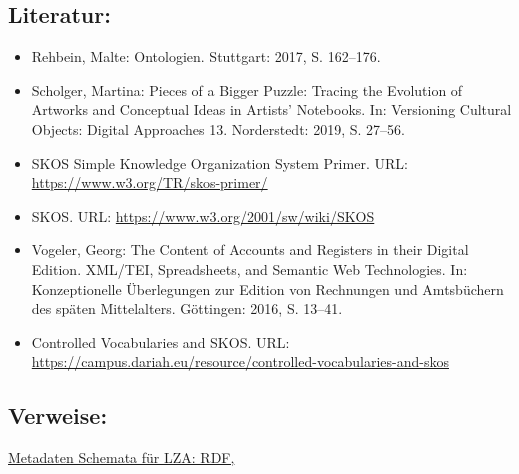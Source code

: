 \documentclass{article}
\begin{document}
        \subsection*{Literatur:}\begin{itemize}\item Rehbein, Malte: Ontologien. Stuttgart: 2017, S. 162–176.\item Scholger, Martina: Pieces of a Bigger Puzzle: Tracing the Evolution of
                              Artworks and Conceptual Ideas in Artists' Notebooks. In: Versioning Cultural Objects: Digital Approaches 13. Norderstedt: 2019, S. 27–56.\item SKOS Simple Knowledge Organization System Primer. URL: \url{https://www.w3.org/TR/skos-primer/}\item SKOS. URL: \url{https://www.w3.org/2001/sw/wiki/SKOS}\item Vogeler, Georg: The Content of Accounts and Registers in their Digital
                              Edition. XML/TEI, Spreadsheets, and Semantic Web Technologies. In: Konzeptionelle Überlegungen zur Edition von Rechnungen
                              und Amtsbüchern des späten Mittelalters. Göttingen: 2016, S. 13–41.\item Controlled Vocabularies and SKOS. URL: \url{https://campus.dariah.eu/resource/controlled-vocabularies-and-skos}\end{itemize}\subsection*{Verweise:}\href{https://gams.uni-graz.at/o:konde.131}{Metadaten Schemata für LZA: RDF,
}
\end{document}
